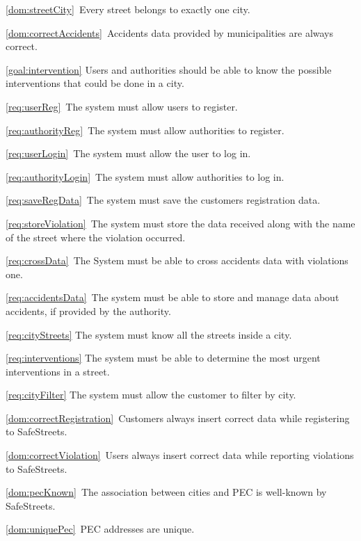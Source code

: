 \begin{description}
\begin{description}
					\item \ref{dom:streetCity}\ Every street belongs to exactly one city.
					\item \ref{dom:correctAccidents}\ Accidents data provided by municipalities are always correct.
				\end{description}	
			\item \ref{goal:intervention} Users and authorities should be able to know the possible interventions that could be done in a city.
				\begin{description}
					\item \ref{req:userReg}\ The system must allow users to register.
					\item \ref{req:authorityReg}\ The system must allow authorities to register.
					\item \ref{req:userLogin}\ The system must allow the user to log in.
					\item \ref{req:authorityLogin}\ The system must allow authorities to log in.
					\item \ref{req:saveRegData}\ The system must save the customers registration data.
					\item \ref{req:storeViolation}\ The system must store the data received along with the name of the street where the violation occurred.
					\item \ref{req:crossData}\ The System must be able to cross accidents data with violations one.
					\item \ref{req:accidentsData}\ The system must be able to store and manage data about accidents, if provided by the authority.
					\item \ref{req:cityStreets} The system must know all the streets inside a city.
					\item \ref{req:interventions} The system must be able to determine the most urgent interventions in a street.
					\item \ref{req:cityFilter} The system must allow the customer to filter by city.
					\item \ref{dom:correctRegistration}\ Customers always insert correct data while registering to SafeStreets.
					\item \ref{dom:correctViolation}\ Users always insert correct data while reporting violations to SafeStreets.
					\item \ref{dom:pecKnown}\ The association between cities and PEC is well-known by SafeStreets.
					\item \ref{dom:uniquePec}\ PEC addresses are unique.

\end{description}
\end{description}
